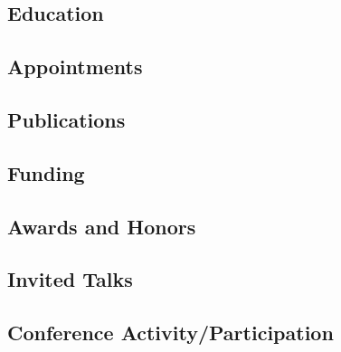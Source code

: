 \documentclass[11pt]{article}
\begin{document}


\begin{center}

\end{center}

\subsection*{Education}


\subsection*{Appointments}


\subsection*{Publications}


\subsection*{Funding}


\subsection*{Awards and Honors}


\subsection*{Invited Talks}


\subsection*{Conference Activity/Participation}


%









%
\end{document}
